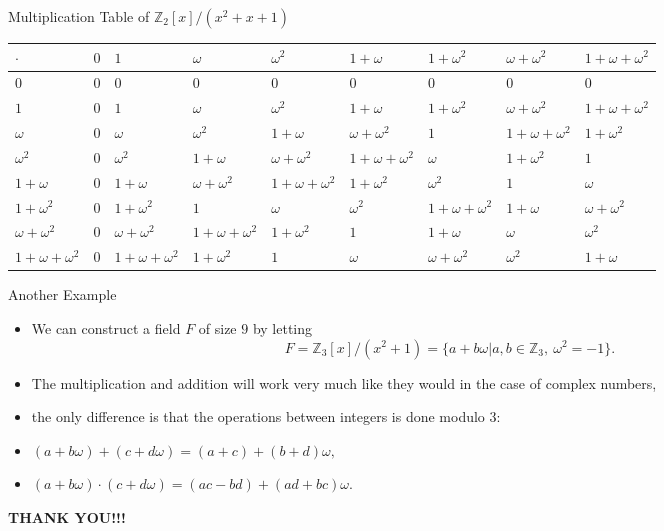 \documentclass[ %
 10pt, xcolor={dvipsnames,svgnames,x11names,hyperref},
   hyperref={colorlinks=true,citecolor=green,linkcolor=DarkRed,urlcolor=ProcessBlue,anchorcolor=blue}
  ]{beamer}
\newenvironment{stepitemize}{\begin{itemize}[<+->]}{\end{itemize} }
\newcommand{\Z}{\mathbb{Z}}
\begin{document}
\begin{frame}{Multiplication Table of $\Z_2[x]/(x^2+x+1)$}
\begin{table}[H]
\tiny{
\begin{tabular}{ p{8mm}|p{8mm}|p{8mm} |p{8mm}|p{8mm}|p{8mm}|p{8mm}|p{8mm}|p{8mm}}
$\cdot$  & $0$ & $1$ & $\omega$ & $\omega^2$ & $1+\omega$ & $1+\omega^2$ & $\omega+\omega^2$ & $1+\omega+\omega^2$ \\
\hline
$0$ &$0$ & $0$ & $0$ & $0$ & $0$ & $0$ & $0$ & $0$   \\ 
\hline
$1$ & $0$ & $1$ & $\omega$ & $\omega^2$ & $1+\omega$ & $1+\omega^2$ & $\omega+\omega^2$ & $1+\omega+\omega^2$ \\ 
\hline
$\omega$ & $0$ & $\omega$ & $\omega^2$ & $1+\omega$  & $\omega+\omega^2$ & $1$ & $1+\omega+\omega^2$ & $1+\omega^2$\\ \hline
$\omega^2$ & $0$ & $\omega^2$ & $1+\omega$&$\omega+\omega^2$ & $1+\omega+\omega^2$ &$\omega$& $1+\omega^2$ & $1$\\
\hline
$1+\omega$ & $0$& $1+\omega$ & $\omega+\omega^2$&$1+\omega+\omega^2$ & $1+\omega^2$ &$\omega^2$& $1$ & $\omega$\\
\hline
$1+\omega^2$ & $0$& $1+\omega^2$&$1$ & $\omega$&$\omega^2$ &$1+\omega+\omega^2$& $1+\omega$ & $\omega+\omega^2$\\
\hline
$\omega+\omega^2$ & $0$&$\omega+\omega^2$& $1+\omega+\omega^2$&$1+\omega^2$ & $1$&$1+\omega$ &$\omega$& $\omega^2$\\
\hline
$1+\omega+\omega^2$ & $0$&$1+\omega+\omega^2$& $1+\omega^2$&$1$ & $\omega$&$\omega+\omega^2$ &$\omega^2$& $1+\omega$\\
\end{tabular}
}
\end{table}

\end{frame}

\begin{frame}{Another Example}
    \begin{stepitemize}
    \item We can construct a field $F$ of size $9$ by letting 
$$F = \Z_3[x]/(x^2+1) = \{a+b\omega|a, b\in \Z_3, \:\omega^2=-1\}.$$

\item The multiplication and addition will work very much like they would in the case of complex numbers,
\item the only difference is that the operations between integers is done modulo $3$:
\item 
$(a+b\omega)+(c+d\omega) = (a+c)+(b+d)\omega,$
\item $(a+b\omega)\cdot(c+d\omega)=(ac-bd)+(ad+bc)\omega.$

    \end{stepitemize}
\end{frame}
\begin{frame}
\centerline{ \color{blue} \bf{\large THANK YOU!!!}}

\end{frame}
\end{document}
